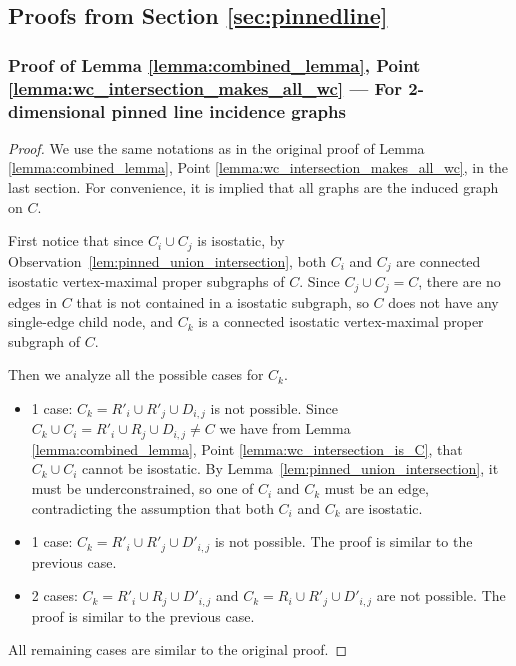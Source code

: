 \subsection{Proofs from Section \ref{sec:pinnedline}}
\subsubsection{Proof of Lemma \ref{lemma:combined_lemma}, Point \ref{lemma:wc_intersection_makes_all_wc} --- For 2-dimensional pinned line incidence graphs}
\label{sec:appendix_pinned}

\begin{proof} %
We use the same notations as in the original proof of Lemma \ref{lemma:combined_lemma}, Point \ref{lemma:wc_intersection_makes_all_wc}, in the last section.
For convenience, it is implied that all graphs are the induced graph on $C$.

First notice that since $C_i \cup C_j$ is isostatic, by Observation~\ref{lem:pinned_union_intersection}, both $C_i$ and $C_j$ are connected isostatic vertex-maximal proper subgraphs of  $C$. Since $C_j \cup C_j = C$, there are no edges in $C$ that is not contained in a isostatic subgraph, so $C$ does not have any single-edge child node, and $C_k$ is a connected isostatic vertex-maximal proper subgraph of  $C$.


\newcommand{\inducedOnC}[1]{#1}

Then we analyze all the possible cases for $C_k$.
\begin{itemize}
    \item 1 case: $C_k=\inducedOnC{R'_i\cup R'_j\cup D_{i,j}}$ is not possible. Since $C_k\cup C_i = \inducedOnC{R'_i\cup R_j\cup D_{i,j}}\neq C$ we have from Lemma \ref{lemma:combined_lemma}, Point \ref{lemma:wc_intersection_is_C}, that $C_k\cup C_i$ cannot be isostatic.
    By Lemma~\ref{lem:pinned_union_intersection}, it must be underconstrained,
    so one of $C_i$ and $C_k$ must be an edge, contradicting the assumption that both $C_i$ and $C_k$ are isostatic.

    \item 1 case: $C_k=\inducedOnC{R'_i\cup R'_j\cup D'_{i,j}}$ is not possible. The proof is similar to the previous case.

    \item 2 cases: $C_k=\inducedOnC{R'_i\cup R_j\cup D'_{i,j}}$ and $C_k=\inducedOnC{R_i\cup R'_j\cup D'_{i,j}}$ are not possible.
    The proof is similar to the previous case.
\end{itemize}

All remaining cases are similar to the original proof.
\end{proof}

